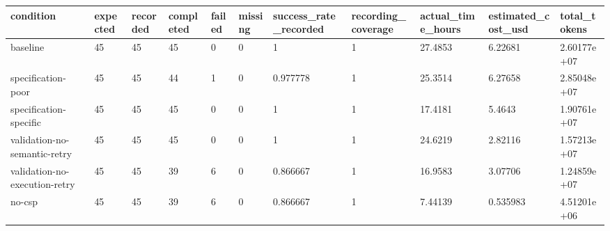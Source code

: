 \begin{tabular}{lllllllllll}
\hline
condition & expected & recorded & completed & failed & missing & success\_rate\_recorded & recording\_coverage & actual\_time\_hours & estimated\_cost\_usd & total\_tokens \\
\hline
baseline & 45 & 45 & 45 & 0 & 0 & 1 & 1 & 27.4853 & 6.22681 & 2.60177e+07 \\
specification-poor & 45 & 45 & 44 & 1 & 0 & 0.977778 & 1 & 25.3514 & 6.27658 & 2.85048e+07 \\
specification-specific & 45 & 45 & 45 & 0 & 0 & 1 & 1 & 17.4181 & 5.4643 & 1.90761e+07 \\
validation-no-semantic-retry & 45 & 45 & 45 & 0 & 0 & 1 & 1 & 24.6219 & 2.82116 & 1.57213e+07 \\
validation-no-execution-retry & 45 & 45 & 39 & 6 & 0 & 0.866667 & 1 & 16.9583 & 3.07706 & 1.24859e+07 \\
no-csp & 45 & 45 & 39 & 6 & 0 & 0.866667 & 1 & 7.44139 & 0.535983 & 4.51201e+06 \\
\hline
\end{tabular}
